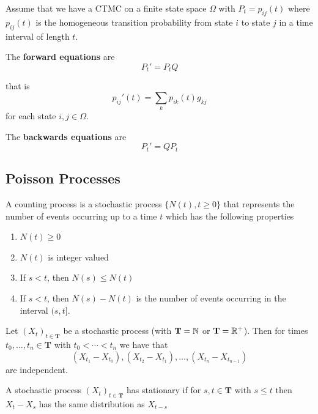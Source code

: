 \begin{theorem} \cite{grimmett2001}
Assume that we have a CTMC on a finite state space $\Omega$ with $P_t = p_{ij}(t)$ where $p_{ij}(t)$ is the homogeneous transition probability from state $i$ to state $j$ in a time interval of length $t$.

The \textbf{forward equations} are
\begin{equation}
    \label{eq:forward_eqs}
    P_t' = P_t Q
\end{equation}

that is
$$
p_{ij}'(t) = \sum_{k} p_{ik}(t) g_{kj}
$$
for each state $i,j \in \Omega$.

The \textbf{backwards equations} are
\begin{equation}
    \label{eq:backwards_eqs}
    P_t' = Q P_t
\end{equation}
\end{theorem}

\subsection{Poisson Processes}

\begin{defn} \cite{Ross_SP_95}
A counting process is a stochastic process $\{N(t), t \geq 0\}$ that represents the number of events occurring up to a time $t$ which has the following properties
\begin{enumerate}
    \item $N(t) \geq 0$
    \item $N(t)$ is integer valued
    \item If $s < t$, then $N(s) \leq N(t)$
    \item If $s < t$, then $N(s) - N(t)$ is the number of events occurring in the interval $(s, t]$.
\end{enumerate}
\end{defn}

\begin{defn}
Let $(X_t)_{t \in \mathbf T}$ be a stochastic process (with $\mathbf T = \mathbb{N}$ or $\mathbf T = \mathbb{R}^+$).
Then for times $t_0, \ldots, t_n \in \mathbf T$ with $t_0 < \cdots < t_n$ we have that
$$
(X_{t_1} - X_{t_0}), (X_{t_2} - X_{t_1}), \ldots, (X_{t_n} - X_{t_{n - 1}})
$$
are independent.
\end{defn}

\begin{defn}
A stochastic process $(X_t)_{t \in \mathbf T}$ has stationary if for $s,t \in \mathbf{T}$ with $s \leq t$ then $X_t - X_s$ has the same distribution as $X_{t - s}$
\end{defn}

